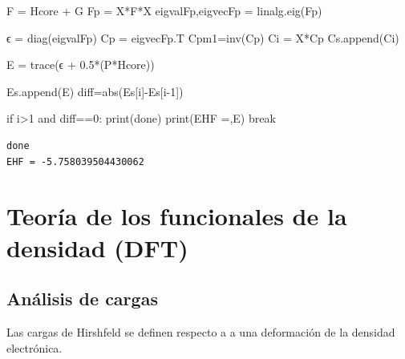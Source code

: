 \documentclass[
  letterpaper,
  DIV=11,
  numbers=noendperiod]{scrreprt}
\newenvironment{Shaded}{\begin{snugshade}}{\end{snugshade}}
\newcommand{\BuiltInTok}[1]{\textcolor[rgb]{0.00,0.23,0.31}{#1}}
\newcommand{\ControlFlowTok}[1]{\textcolor[rgb]{0.00,0.23,0.31}{#1}}
\newcommand{\DecValTok}[1]{\textcolor[rgb]{0.68,0.00,0.00}{#1}}
\newcommand{\FloatTok}[1]{\textcolor[rgb]{0.68,0.00,0.00}{#1}}
\newcommand{\KeywordTok}[1]{\textcolor[rgb]{0.00,0.23,0.31}{#1}}
\newcommand{\NormalTok}[1]{\textcolor[rgb]{0.00,0.23,0.31}{#1}}
\newcommand{\OperatorTok}[1]{\textcolor[rgb]{0.37,0.37,0.37}{#1}}
\newcommand{\StringTok}[1]{\textcolor[rgb]{0.13,0.47,0.30}{#1}}
\begin{document}
\begin{Shaded}
\begin{Highlighting}[]
\NormalTok{    F }\OperatorTok{=}\NormalTok{ Hcore }\OperatorTok{+}\NormalTok{ G}
\NormalTok{    Fp }\OperatorTok{=}\NormalTok{ X}\OperatorTok{*}\NormalTok{F}\OperatorTok{*}\NormalTok{X}
\NormalTok{    eigvalFp,eigvecFp }\OperatorTok{=}\NormalTok{ linalg.eig(Fp)}
    
\NormalTok{    ϵ }\OperatorTok{=}\NormalTok{ diag(eigvalFp)}
\NormalTok{    Cp }\OperatorTok{=}\NormalTok{ eigvecFp.T}
\NormalTok{    Cpm1}\OperatorTok{=}\NormalTok{inv(Cp)}
\NormalTok{    Ci }\OperatorTok{=}\NormalTok{ X}\OperatorTok{*}\NormalTok{Cp}
\NormalTok{    Cs.append(Ci)}

\NormalTok{    E }\OperatorTok{=}\NormalTok{ trace(ϵ }\OperatorTok{+} \FloatTok{0.5}\OperatorTok{*}\NormalTok{(P}\OperatorTok{*}\NormalTok{Hcore))}

\NormalTok{    Es.append(E)}
\NormalTok{    diff}\OperatorTok{=}\BuiltInTok{abs}\NormalTok{(Es[i]}\OperatorTok{{-}}\NormalTok{Es[i}\OperatorTok{{-}}\DecValTok{1}\NormalTok{])}
    
    \ControlFlowTok{if}\NormalTok{ i}\OperatorTok{\textgreater{}}\DecValTok{1} \KeywordTok{and}\NormalTok{ diff}\OperatorTok{==}\DecValTok{0}\NormalTok{:}
        \BuiltInTok{print}\NormalTok{(}\StringTok{\textquotesingle{}done\textquotesingle{}}\NormalTok{)}
        \BuiltInTok{print}\NormalTok{(}\StringTok{\textquotesingle{}EHF =\textquotesingle{}}\NormalTok{,E)}
        \ControlFlowTok{break}
\end{Highlighting}
\end{Shaded}

\begin{verbatim}
done
EHF = -5.758039504430062
\end{verbatim}


\hypertarget{teoruxeda-de-los-funcionales-de-la-densidad-dft}{%
\chapter{Teoría de los funcionales de la densidad
(DFT)}\label{teoruxeda-de-los-funcionales-de-la-densidad-dft}}

\hypertarget{anuxe1lisis-de-cargas}{%
\section{Análisis de cargas}\label{anuxe1lisis-de-cargas}}

Las cargas de Hirshfeld se definen respecto a a una deformación de la
densidad electrónica.
\end{document}
